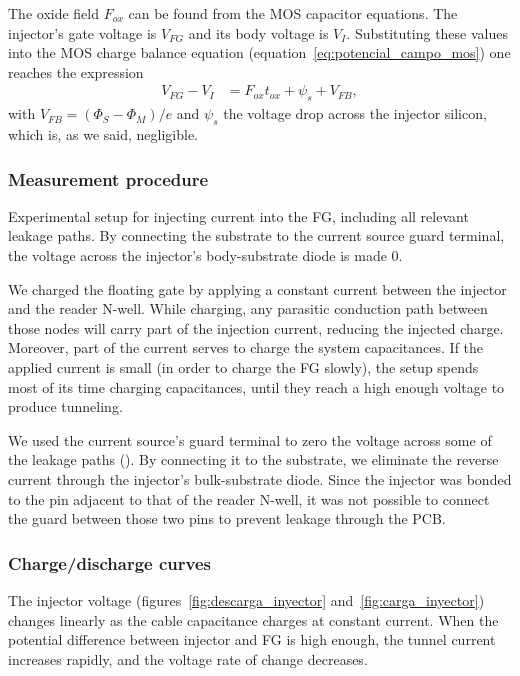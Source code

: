 {%
The oxide field $F_{ox}$ can be found from the MOS capacitor equations.
The injector's gate voltage is $V_{FG}$
and its body voltage is $V_I$.
Substituting these values into the MOS charge balance equation
(equation~\ref{eq:potencial_campo_mos})
one reaches the expression
\begin{align*}
    V_{FG}-V_I &= F_{ox}t_{ox}+\psi_s+V_{FB},
\end{align*}
with $V_{FB}=(\Phi_S-\Phi_M)/e$ 
and $\psi_s$ the voltage drop across the injector silicon,
which is, as we said, negligible.
%
\subsubsection{Measurement procedure}
{Experimental setup for injecting current into the FG,
including all relevant leakage paths.}
By connecting the substrate to the current source guard terminal,
the voltage across the injector's body-substrate diode is made 0.}
We charged the floating gate by applying a constant current 
between the injector and the reader N-well.
While charging, any parasitic conduction path between those nodes
will carry part of the injection current,
reducing the injected charge.
Moreover, part of the current serves to charge the system capacitances.
If the applied current is small (in order to charge the FG slowly),
the setup spends most of its time charging capacitances,
until they reach a high enough voltage to produce tunneling.

We used the current source's guard terminal to zero the voltage across some of the leakage paths
().
By connecting it to the substrate,
we eliminate the reverse current through the injector's bulk-substrate diode.
Since the injector was bonded to the pin adjacent to that of the reader N-well,
it was not possible to connect the guard between those two pins 
to prevent leakage through the PCB.
\subsubsection{Charge/discharge curves}
The injector voltage (figures~\ref{fig:descarga_inyector}
and~\ref{fig:carga_inyector})
changes linearly as the cable capacitance charges at constant current.
When the potential difference between injector and FG is high enough,
the tunnel current increases rapidly, and the voltage rate of change decreases.

